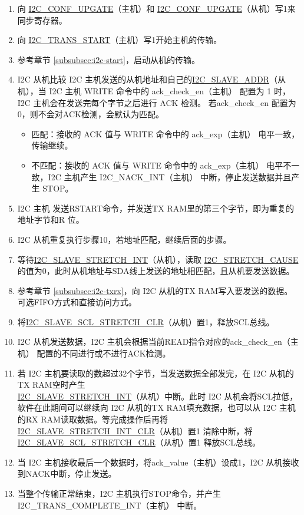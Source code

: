 \documentclass[main\_\_CN.tex]{subfiles}
\begin{document}
\begin{enumerate}
\item 向 \hyperref[fielddesc:I2CCONFUPGATE]{I2C\_CONF\_UPGATE}（主机）和 \hyperref[fielddesc:I2CCONFUPGATE]{I2C\_CONF\_UPGATE}（从机）写1来同步寄存器。
\item 向 \hyperref[fielddesc:I2CTRANSSTART]{I2C\_TRANS\_START}（主机）写1开始主机的传输。
\item 参考章节 \ref{subsubsec:i2c-start}，启动从机的传输。
\item I2C 从机比较 I2C 主机发送的从机地址和自己的\hyperref[fielddesc:I2CSLAVEADDR]{I2C\_SLAVE\_ADDR}（从机），当 I2C 主机 WRITE 命令中的 ack\_check\_en（主机） 配置为 1 时，I2C 主机会在发送完每个字节之后进行 ACK 检测。 若ack\_check\_en 配置为 0，则不会对ACK检测，会默认为匹配。
\begin{itemize}
\item 匹配：接收的 ACK 值与 WRITE 命令中的 ack\_exp（主机） 电平一致，传输继续。
\item 不匹配：接收的 ACK 值与 WRITE 命令中的 ack\_exp（主机） 电平不一致，I2C 主机产生 I2C\_NACK\_INT（主机） 中断，停止发送数据并且产生 STOP。
\end{itemize}

\item I2C 主机 发送RSTART命令，并发送TX RAM里的第三个字节，即为重复的地址字节和R 位。
\item I2C 从机重复执行步骤10，若地址匹配，继续后面的步骤。

\item 等待\hyperref[int:i2c-slave-stretch]{I2C\_SLAVE\_STRETCH\_INT}（从机），读取 \hyperref[fielddesc:I2CSTRETCHCAUSE]{I2C\_STRETCH\_CAUSE} 的值为0，此时从机地址与SDA线上发送的地址相匹配，且从机要发送数据。
\item 参考章节 \ref{subsubsec:i2c-txrx}，向 I2C 从机的TX RAM写入要发送的数据。可选FIFO方式和直接访问方式。
\item 将\hyperref[fielddesc:I2CSLAVESCLSTRETCHCLR]{I2C\_SLAVE\_SCL\_STRETCH\_CLR}（从机）置1，释放SCL总线。


\item I2C 从机发送数据，I2C 主机会根据当前READ指令对应的ack\_check\_en（主机） 配置的不同进行或不进行ACK检测。
\item 若 I2C 主机要读取的数超过32个字节，当发送数据全部发完，在 I2C 从机的TX RAM空时产生 \\\hyperref[int:i2c-slave-stretch]{I2C\_SLAVE\_STRETCH\_INT}（从机）中断。此时 I2C 从机会将SCL拉低，软件在此期间可以继续向 I2C 从机的TX RAM填充数据，也可以从 I2C 主机的RX RAM读取数据。等完成操作后再将 \hyperref[fielddesc:I2CSLAVESTRETCHINTCLR]{I2C\_SLAVE\_STRETCH\_INT\_CLR}（从机）置1 清除中断，将\hyperref[fielddesc:I2CSLAVESCLSTRETCHCLR]{I2C\_SLAVE\_SCL\_STRETCH\_CLR}（从机）置1 释放SCL总线。

\item 当 I2C 主机接收最后一个数据时，将ack\_value（主机）设成1，I2C 从机接收到NACK中断，停止发送。

\item 当整个传输正常结束，I2C 主机执行STOP命令，并产生 I2C\_TRANS\_COMPLETE\_INT（主机） 中断。
\end{enumerate}
\end{document}
